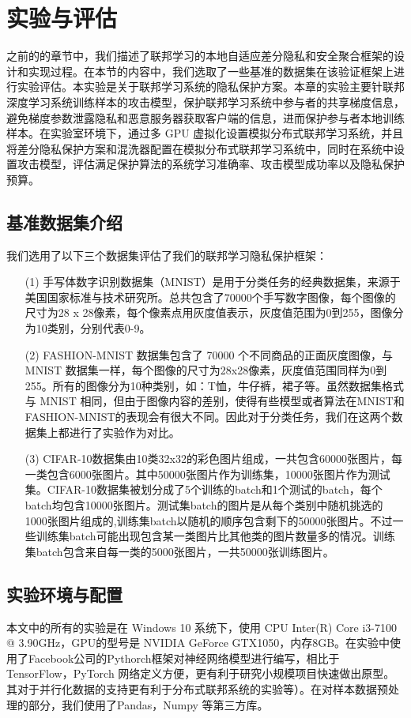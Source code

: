 \chapter{实验与评估}
\label{ch5}
之前的的章节中，我们描述了联邦学习的本地自适应差分隐私和安全聚合框架的设计和实现过程。在本节的内容中，我们选取了一些基准的数据集在该验证框架上进行实验评估。本实验是关于联邦学习系统的隐私保护方案。本章的实验主要针联邦深度学习系统训练样本的攻击模型，保护联邦学习系统中参与者的共享梯度信息，避免梯度参数泄露隐私和恶意服务器获取客户端的信息，进而保护参与者本地训练样本。在实验室环境下，通过多 GPU 虚拟化设置模拟分布式联邦学习系统，并且将差分隐私保护方案和混洗器配置在模拟分布式联邦学习系统中，同时在系统中设置攻击模型，评估满足保护算法的系统学习准确率、攻击模型成功率以及隐私保护预算。 
\section{基准数据集介绍}
我们选用了以下三个数据集评估了我们的联邦学习隐私保护框架：
\begin{enumerate}
	\item [(1)] 手写体数字识别数据集（MNIST）是用于分类任务的经典数据集，来源于美国国家标准与技术研究所。总共包含了70000个手写数字图像，每个图像的尺寸为28 x 28像素，每个像素点用灰度值表示，灰度值范围为0到255，图像分为10类别，分别代表0-9。
	\item [(2)] FASHION-MNIST 数据集包含了 70000 个不同商品的正面灰度图像，与 MNIST 数据集一样，每个图像的尺寸为28x28像素，灰度值范围同样为0到255。所有的图像分为10种类别，如：T恤，牛仔裤，裙子等。虽然数据集格式与 MNIST 相同，但由于图像内容的差别，使得有些模型或者算法在MNIST和FASHION-MNIST的表现会有很大不同。因此对于分类任务，我们在这两个数据集上都进行了实验作为对比。
	\item [(3)] CIFAR-10数据集由10类32x32的彩色图片组成，一共包含60000张图片，每一类包含6000张图片。其中50000张图片作为训练集，10000张图片作为测试集。CIFAR-10数据集被划分成了5个训练的batch和1个测试的batch，每个batch均包含10000张图片。测试集batch的图片是从每个类别中随机挑选的1000张图片组成的,训练集batch以随机的顺序包含剩下的50000张图片。不过一些训练集batch可能出现包含某一类图片比其他类的图片数量多的情况。训练集batch包含来自每一类的5000张图片，一共50000张训练图片。


\end{enumerate}

\section{实验环境与配置}
本文中的所有的实验是在 Windows 10 系统下，使用 CPU Inter(R) Core i3-7100 @ 3.90GHz，GPU的型号是 NVIDIA GeForce GTX1050，内存8GB。在实验中使用了Facebook公司的Pythorch框架对神经网络模型进行编写，相比于TensorFlow，PyTorch 网络定义方便，更有利于研究小规模项目快速做出原型。其对于并行化数据的支持更有利于分布式联邦系统的实验等）。在对样本数据预处理的部分，我们使用了Pandas，Numpy 等第三方库。

